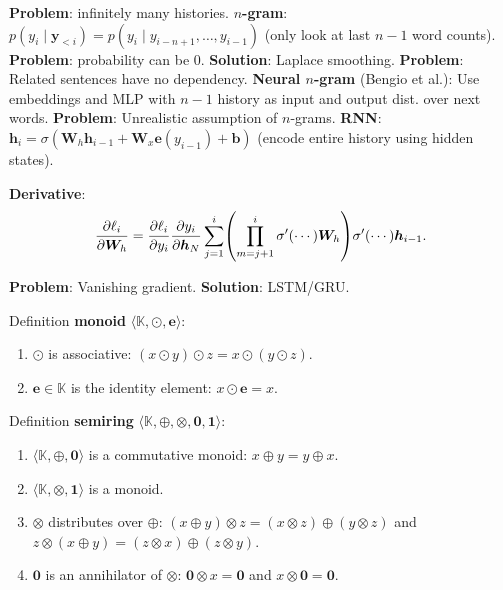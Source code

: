 \documentclass{article}
\newcommand{\lft}{\mathopen{}\left}
\newcommand{\rgt}{\aftergroup\mathclose\aftergroup{\aftergroup}\right}
\newenvironment{topic}[1]
{\begin{tcolorbox}[
  title=#1,
  breakable,
  colback=white,
  colframe=black,
  fonttitle={\bfseries\sffamily},
  sharp corners,
  boxrule=0.5pt,
  boxsep=0.1cm,
  top=0cm,
  bottom=0cm,
  left=0.1cm,
  right=0.1cm,
  enhanced jigsaw,
]}
{\end{tcolorbox}}
\begin{document}
\begin{multicols}{3}
\begin{topic}{Language modelling}
  \textbf{Problem}: infinitely many histories. \textbf{$n$-gram}: $p(y_i\mid
  \bm{y}_{<i}) = p(y_i\mid y_{i-n+1},\ldots,y_{i-1})$ (only look at last $n-1$
  word counts). \textbf{Problem}: probability can be 0. \textbf{Solution}:
  Laplace smoothing. \textbf{Problem}: Related sentences have no dependency.
  \textbf{Neural $n$-gram} (Bengio et al.): Use embeddings and MLP
  with $n-1$ history as input and output dist. over next words.
  \textbf{Problem}: Unrealistic assumption of $n$-grams. \textbf{RNN}:
  $\bm{h}_i = \sigma( \bm{W}_h \bm{h}_{i-1} + \bm{W}_x \bm{e}(y_{i-1})
  + \bm{b})$ (encode entire history using hidden states).

  \textbf{Derivative}: \[
    \pdv{\ell_i}{\bm{W}_h} = \pdv{\ell_i}{y_i} \pdv{y_i}{\bm{h}_N} \sum_{j=1}^i \lft( \prod_{m=j+1}^i \sigma'(\cdots) \bm{W}_h \rgt) \sigma'(\cdots) \bm{h}_{i-1}
  .\]

  \textbf{Problem}: Vanishing gradient. \textbf{Solution}: LSTM/GRU.
\end{topic}

\begin{topic}{Semirings}
  Definition \textbf{monoid} $\langle \mathbb{K}, \odot, \bm{e} \rangle$:
  \begin{enumerate}
    \item $\odot$ is associative: $(x\odot y) \odot z = x \odot (y \odot z)$.
    \item $\bm{e}\in\mathbb{K}$ is the identity element: $x\odot \bm{e} = x$.
  \end{enumerate}

  Definition \textbf{semiring} $\langle \mathbb{K},\oplus,\otimes,\bm{0},\bm{1}
  \rangle$:
  \begin{enumerate}
    \item $\langle \mathbb{K},\oplus,\bm{0} \rangle$ is a commutative monoid:
      $x \oplus y = y \oplus x$.
    \item $\langle \mathbb{K},\otimes,\bm{1} \rangle$ is a monoid.
    \item $\otimes$ distributes over $\oplus$: $(x \oplus y) \otimes z =
      (x\otimes z) \oplus (y \otimes z)$ and $z \otimes (x \oplus y) = (z
      \otimes x) \oplus (z \otimes y)$.
    \item $\bm{0}$ is an annihilator of $\otimes$: $\bm{0} \otimes x = \bm{0}$
      and $x \otimes \bm{0} = \bm{0}$.
  \end{enumerate}



\end{topic}
\end{multicols}
\end{document}
